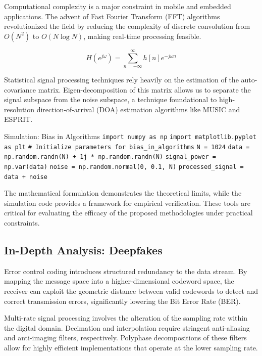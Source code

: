Computational complexity is a major constraint in mobile and embedded applications. The advent of Fast Fourier Transform (FFT) algorithms revolutionized the field by reducing the complexity of discrete convolution from $O(N^2)$ to $O(N \log N)$, making real-time processing feasible.

\begin{equation}
    H(e^{j\omega}) = \sum_{n=-\infty}^{\infty} h[n] e^{-j\omega n}
\end{equation}

Statistical signal processing techniques rely heavily on the estimation of the auto-covariance matrix. Eigen-decomposition of this matrix allows us to separate the signal subspace from the noise subspace, a technique foundational to high-resolution direction-of-arrival (DOA) estimation algorithms like MUSIC and ESPRIT.

\begin{pythonbox}{Simulation: Bias in Algorithms}
\texttt{import numpy as np}
\texttt{import matplotlib.pyplot as plt}
\texttt{}
\texttt{\# Initialize parameters for bias\_in\_algorithms}
\texttt{N = 1024}
\texttt{data = np.random.randn(N) + 1j * np.random.randn(N)}
\texttt{signal\_power = np.var(data)}
\texttt{noise = np.random.normal(0, 0.1, N)}
\texttt{processed\_signal = data + noise}
\end{pythonbox}

\vspace{0.5cm}
The mathematical formulation demonstrates the theoretical limits, while the simulation code provides a framework for empirical verification. These tools are critical for evaluating the efficacy of the proposed methodologies under practical constraints.


\subsection{In-Depth Analysis: Deepfakes}
Error control coding introduces structured redundancy to the data stream. By mapping the message space into a higher-dimensional codeword space, the receiver can exploit the geometric distance between valid codewords to detect and correct transmission errors, significantly lowering the Bit Error Rate (BER).

Multi-rate signal processing involves the alteration of the sampling rate within the digital domain. Decimation and interpolation require stringent anti-aliasing and anti-imaging filters, respectively. Polyphase decompositions of these filters allow for highly efficient implementations that operate at the lower sampling rate.

